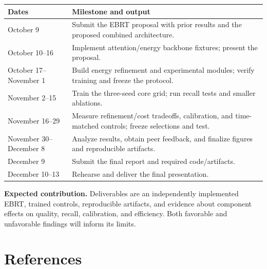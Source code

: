 \documentclass[11pt,letterpaper]{article}
\begin{document}
\smallskip\begin{tabularx}{\textwidth}{@{}p{3.2cm}X@{}}\toprule
\textbf{Dates} & \textbf{Milestone and output}\\\midrule
October 9 & Submit the EBRT proposal with prior results and the proposed combined architecture.\\
October 10–16 & Implement attention/energy backbone fixtures; present the proposal.\\
October 17–November 1 & Build energy refinement and experimental modules; verify training and freeze the protocol.\\
November 2–15 & Train the three-seed core grid; run recall tests and smaller ablations.\\
November 16–29 & Measure refinement/cost tradeoffs, calibration, and time-matched controls; freeze selections and test.\\
November 30–December 8 & Analyze results, obtain peer feedback, and finalize figures and reproducible artifacts.\\
December 9 & Submit the final report and required code/artifacts.\\
December 10–13 & Rehearse and deliver the final presentation.\\
\bottomrule\end{tabularx}\smallskip

\textbf{Expected contribution.} Deliverables are an independently implemented EBRT, trained controls, reproducible artifacts, and evidence about component effects on quality, recall, calibration, and efficiency. Both favorable and unfavorable findings will inform its limits.

\newpage
\section*{References}
\end{document}
